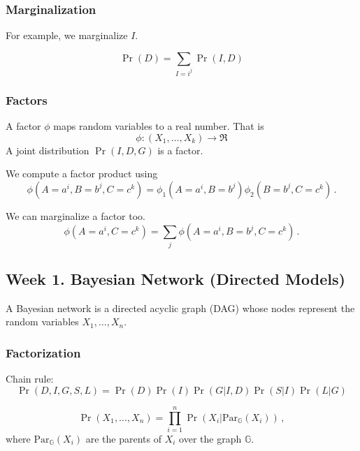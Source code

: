 \documentclass[12pt]{article}
\begin{document}
\subsubsection{Marginalization}
For example, we marginalize $I$.

\begin{equation*}
  \Pr(D) = \sum_{I=i^j} \Pr(I, D)
\end{equation*}


\subsubsection{Factors}
A factor $\phi$ maps random variables to a real number. That is
\begin{equation*}
  \phi : (X_1, \ldots, X_k) \rightarrow \Re
\end{equation*}
A joint distribution $\Pr(I, D, G)$ is a factor.

We compute a factor product using
\begin{equation*}
  \phi(A=a^i, B=b^j, C=c^k) = \phi_1(A=a^i, B=b^j) \phi_2(B=b^j, C=c^k) \, .
\end{equation*}

We can marginalize a factor too.
\begin{equation*}
  \phi(A=a^i, C=c^k) = \sum_j \phi(A=a^i, B=b^j, C=c^k) \,.
\end{equation*}




\subsection{Week 1. Bayesian Network (Directed Models)}

A Bayesian network is a directed acyclic graph (DAG) whose nodes represent the random variables $X_1, \ldots, X_n$.
\subsubsection{Factorization}
Chain rule:
\begin{equation}
  \Pr(D, I, G, S, L) = \Pr(D) \Pr(I) \Pr(G|I, D) \Pr(S|I) \Pr(L|G)
\end{equation}

\begin{equation}
  \Pr(X_1, ..., X_n) = \prod_{i=1}^n \Pr(X_i | \text{Par}_\mathbb{G}( X_i ) ) \, ,
\end{equation}
where $\text{Par}_\mathbb{G}( X_i )$ are the parents of $X_i$ over the graph $\mathbb{G}$.
\end{document}

